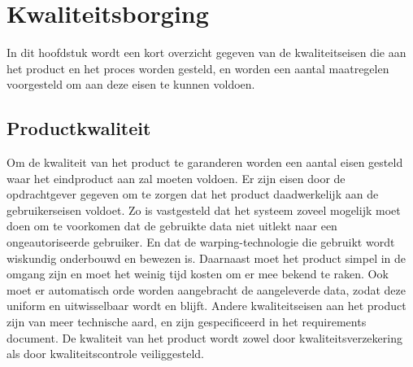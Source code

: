 \section{Kwaliteitsborging}
\label{kwaliteit}
In dit hoofdstuk wordt een kort overzicht gegeven van de kwaliteitseisen die aan het product en het proces worden gesteld,
en worden een aantal maatregelen voorgesteld om aan deze eisen te kunnen voldoen.






\subsection{Productkwaliteit}
Om de kwaliteit van het product te garanderen worden een aantal eisen gesteld waar het eindproduct aan zal moeten voldoen.
Er zijn eisen door de opdrachtgever gegeven om te zorgen dat het product daadwerkelijk aan de gebruikerseisen voldoet.
Zo is vastgesteld dat het systeem zoveel mogelijk moet doen om te voorkomen dat de gebruikte data niet uitlekt naar een ongeautoriseerde gebruiker. En dat de warping-technologie die gebruikt wordt wiskundig onderbouwd en bewezen is.
Daarnaast moet het product simpel in de omgang zijn en moet het weinig tijd kosten om er mee bekend te raken.
Ook moet er automatisch orde worden aangebracht de aangeleverde data, zodat deze uniform en uitwisselbaar wordt en blijft.
Andere kwaliteitseisen aan het product zijn van meer technische aard, en zijn gespecificeerd in het requirements document.
De kwaliteit van het product wordt zowel door kwaliteitsverzekering als door kwaliteitscontrole veiliggesteld.

